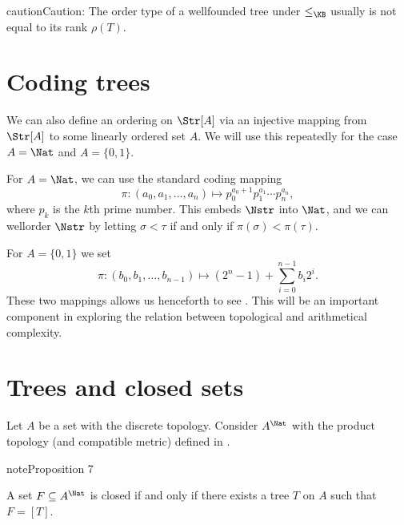 \documentclass[letterpaper,10pt,english]{jupyterBook}
\begin{document}
\begin{sphinxadmonition}{caution}{Caution:}
\sphinxAtStartPar
The order type of a well\sphinxhyphen{}founded tree under \(\leq_{\KB}\) usually is not equal to its rank \(\rho(T)\).
\end{sphinxadmonition}


\section{Coding trees}
\label{\detokenize{trees:coding-trees}}
\sphinxAtStartPar
We can also define an ordering on \(\Str[A]\) via an injective mapping from \(\Str[A]\) to some linearly ordered set \(A\). We will use this repeatedly for the case \(A = \Nat\) and \(A = \{0,1\}\).

\sphinxAtStartPar
For \(A = \Nat\), we can use the standard coding mapping
\begin{equation*}
	\pi: (a_0, a_1, \dots, a_n) \mapsto p_0^{a_0+1}p_1^{a_1}\cdots p_n^{a_n},
\end{equation*}
\sphinxAtStartPar
where \(p_k\) is the \(k\)th prime number. This embeds \(\Nstr\) into \(\Nat\), and we can well\sphinxhyphen{}order \(\Nstr\) by letting \(\sigma < \tau\) if and only if \(\pi(\sigma) < \pi(\tau)\).

\sphinxAtStartPar
For \(A = \{0,1\}\) we set
\begin{equation*}
	\pi: (b_0,b_1, \dots, b_{n-1}) \mapsto (2^n-1) + \sum_{i=0}^{n-1} b_i 2^i.
\end{equation*}
\sphinxAtStartPar
These two mappings allows us henceforth to see . This will be an important component in exploring the relation between topological and arithmetical complexity.


\section{Trees and closed sets}
\label{\detokenize{trees:trees-and-closed-sets}}
\sphinxAtStartPar
Let \(A\) be a set with the discrete topology. Consider \(A^\Nat\) with the product topology (and compatible metric) defined in {\hyperref[\detokenize{polish:polish-product-spaces}]{}}.
\label{trees:prop-trees-closed}
\begin{sphinxadmonition}{note}{Proposition 7}



\sphinxAtStartPar
A set \(F \subseteq A^\Nat\) is closed if and only if there exists a tree \(T\) on \(A\) such that \(F = [T]\).
\end{sphinxadmonition}
\end{document}
